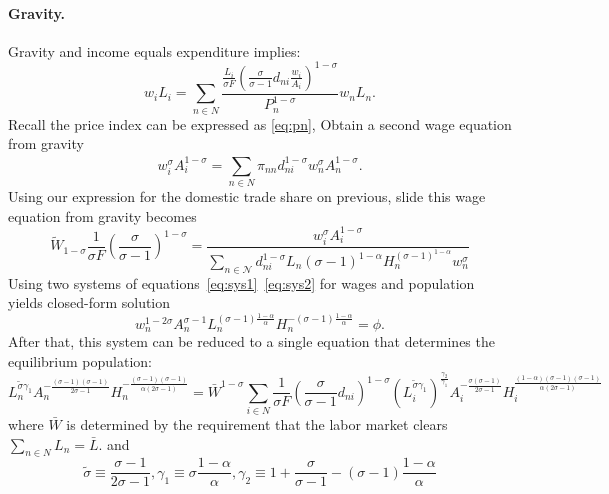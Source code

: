 \documentclass[11pt,a4paper]{article}
\begin{document}
\paragraph{Gravity.}
Gravity and income equals expenditure implies: 
\begin{equation}
  w_i L_i = \sum_{n \in N}^{} \frac{\frac{L_i}{\sigma F} \left( \frac{\sigma }{\sigma -1} d_{ni} \frac{w_i}{A_i} \right)^{1-\sigma }}{P_n^{1-\sigma }} w_n L_n.
\end{equation}
Recall the price index can be expressed as \eqref{eq:pn}, Obtain a second wage equation from gravity \begin{equation}
  w_i^\sigma A_i^{1-\sigma } = \sum_{n \in N}^{} \pi _{nn} d_{ni}^{1-\sigma } w_n^\sigma A_n^{1-\sigma }.
\end{equation}
Using our expression for the domestic trade share on previous, slide this wage equation from gravity becomes
\begin{equation}
\tilde{W}_{1-\sigma} \frac{1}{\sigma F} \left( \frac{\sigma}{\sigma - 1} \right)^{1-\sigma} = \frac{w_i^{\sigma} A_i^{1-\sigma}}{\sum_{n \in \mathcal{N}} d_{ni}^{1-\sigma} L_n (\sigma - 1)^{1-\alpha} H_n^{(\sigma - 1)^{1-\alpha}} w_n^{\sigma}}\label{eq:sys2}
\end{equation}
Using two systems of equations~\eqref{eq:sys1}~\eqref{eq:sys2} for wages and population yields closed-form solution 
\begin{equation}
  w_n^{1-2\sigma} A_n^{\sigma -1} L_n^{(\sigma -1)\frac{1-\alpha }{\alpha }} H_n^{-(\sigma -1)\frac{1-\alpha }{\alpha }} = \phi .
\end{equation}
After that, this system can be reduced to a single equation that determines the equilibrium population:
\begin{equation}
  L_n ^{\tilde{\sigma }\gamma _1} A_n ^{- \frac{(\sigma -1) (\sigma -1)}{2\sigma - 1}} H_n ^{- \frac{(\sigma -1) (\sigma -1)}{\alpha(2\sigma - 1)}} = \bar{W}^{1-\sigma } \sum_{i \in N}^{} \frac{1}{\sigma F} \left( \frac{\sigma }{\sigma -1} d_{ni} \right)^{1-\sigma } \left( L_i ^{\tilde{\sigma }\gamma _1} \right)^{\frac{\gamma _2}{\gamma _1}} A_i ^{- \frac{\sigma (\sigma -1)}{2\sigma - 1}} H_i ^{\frac{(1-\alpha)(\sigma -1) (\sigma -1)}{\alpha(2\sigma - 1)}}
\end{equation}
where $\bar{W}$ is determined by the requirement that the labor market clears $\sum_{n \in N}^{} L_n = \bar{L}$. 
and $$ \tilde{\sigma } \equiv \frac{\sigma -1}{2 \sigma -1}, \gamma _1 \equiv \sigma \frac{1-\alpha }{\alpha }, \gamma _2 \equiv 1 + \frac{\sigma }{\sigma -1}- (\sigma -1) \frac{1-\alpha }{\alpha } $$
\end{document}
